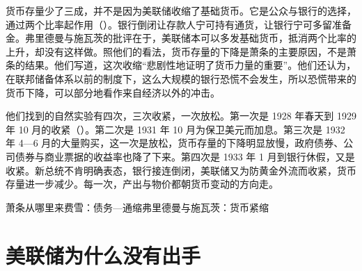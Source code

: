 货币存量少了三成，并不是因为美联储收缩了基础货币。它是公众与银行的选择，通过两个比率起作用（）。银行倒闭让存款人宁可持有通货，让银行宁可多留准备金\cite{frhpanic1}。弗里德曼与施瓦茨的批评在于，美联储本可以多发基础货币，抵消两个比率的上升，却没有这样做\cite{frhgd}。照他们的看法，货币存量的下降是萧条的主要原因，不是萧条的结果。他们写道，这次收缩“悲剧性地证明了货币力量的重要”\cite{bernanke2002}。他们还认为，在联邦储备体系以前的制度下，这么大规模的银行恐慌不会发生，所以恐慌带来的货币下降，可以部分地看作来自经济以外的冲击\cite{bernanke2002}。

他们找到的自然实验有四次，三次收紧，一次放松\cite{bernanke2002}。第一次是 1928 年春天到 1929 年 10 月的收紧（）。第二次是 1931 年 10 月为保卫美元而加息。第三次是 1932 年 4—6 月的大量购买，这一次是放松，货币存量的下降明显放慢，政府债券、公司债券与商业票据的收益率也降了下来\cite{bernanke2002}。第四次是 1933 年 1 月到银行休假，又是收紧。新总统不肯明确表态，银行接连倒闭，美联储又为防黄金外流而收紧，货币存量进一步减少\cite{bernanke2002}。每一次，产出与物价都朝货币变动的方向走\cite{bernanke2002}。

\begin{compare}{萧条从哪里来}{费雪：债务—通缩}{弗里德曼与施瓦茨：货币紧缩}
\end{compare}

\section{美联储为什么没有出手}\label{sec:depressionus-fed}

